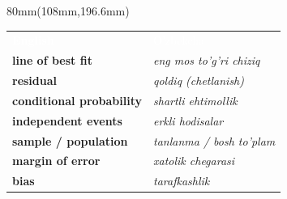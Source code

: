 \documentclass[a4paper]{article}
\begin{document}
\begin{textblock*}{80mm}(108mm,196.6mm)
{\fontsize{10.5}{12}\selectfont
\begin{tabular}{@{}>{\bfseries}p{37mm}p{36mm}@{}}
\cellcolor{accent}\textcolor{white}{\sffamily English} & \cellcolor{accent}\textcolor{white}{\sffamily O'zbekcha}\\
\rowcolor{badge!45} line of best fit & {\itshape eng mos to'g'ri chiziq}\\
\rowcolor{white} residual & {\itshape qoldiq (chetlanish)}\\
\rowcolor{badge!45} conditional probability & {\itshape shartli ehtimollik}\\
\rowcolor{white} independent events & {\itshape erkli hodisalar}\\
\rowcolor{badge!45} sample / population & {\itshape tanlanma / bosh to'plam}\\
\rowcolor{white} margin of error & {\itshape xatolik chegarasi}\\
\rowcolor{badge!45} bias & {\itshape tarafkashlik}\\
\end{tabular}}
\end{textblock*}
\end{document}
